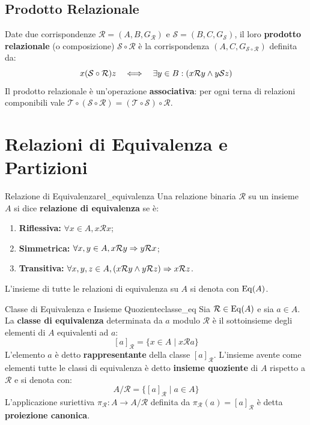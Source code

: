 \subsection{Prodotto Relazionale}
Date due corrispondenze $\mathcal{R} = (A, B, G_\mathcal{R})$ e $\mathcal{S} = (B, C, G_\mathcal{S})$, il loro \textbf{prodotto relazionale} (o composizione) $\mathcal{S} \circ \mathcal{R}$ è la corrispondenza $(A, C, G_{\mathcal{S}\circ\mathcal{R}})$ definita da:
\[
    x (\mathcal{S} \circ \mathcal{R}) z \quad \Longleftrightarrow \quad \exists y \in B : (x \mathcal{R} y \wedge y \mathcal{S} z)
\]
Il prodotto relazionale è un'operazione \textbf{associativa}: per ogni terna di relazioni componibili vale $\mathcal{T} \circ (\mathcal{S} \circ \mathcal{R}) = (\mathcal{T} \circ \mathcal{S}) \circ \mathcal{R}$.

\section{Relazioni di Equivalenza e Partizioni}

\begin{definizione}{Relazione di Equivalenza}{rel_equivalenza}
Una relazione binaria $\mathcal{R}$ su un insieme $A$ si dice \textbf{relazione di equivalenza} se è:
\begin{enumerate}
    \item \textbf{Riflessiva:} $\forall x \in A, x \mathcal{R} x$;
    \item \textbf{Simmetrica:} $\forall x, y \in A, x \mathcal{R} y \Rightarrow y \mathcal{R} x$;
    \item \textbf{Transitiva:} $\forall x, y, z \in A, (x \mathcal{R} y \wedge y \mathcal{R} z) \Rightarrow x \mathcal{R} z$.
\end{enumerate}
L'insieme di tutte le relazioni di equivalenza su $A$ si denota con $\operatorname{Eq}(A)$.
\end{definizione}

\begin{definizione}{Classe di Equivalenza e Insieme Quoziente}{classe_eq}
Sia $\mathcal{R} \in \operatorname{Eq}(A)$ e sia $a \in A$. La \textbf{classe di equivalenza} determinata da $a$ modulo $\mathcal{R}$ è il sottoinsieme degli elementi di $A$ equivalenti ad $a$:
\[
    [a]_\mathcal{R} = \{x \in A \mid x \mathcal{R} a\}
\]
L'elemento $a$ è detto \textbf{rappresentante} della classe $[a]_\mathcal{R}$.
L'insieme avente come elementi tutte le classi di equivalenza è detto \textbf{insieme quoziente} di $A$ rispetto a $\mathcal{R}$ e si denota con:
\[
    A/\mathcal{R} = \{[a]_\mathcal{R} \mid a \in A\}
\]
L'applicazione suriettiva $\pi_\mathcal{R}: A \to A/\mathcal{R}$ definita da $\pi_\mathcal{R}(a) = [a]_\mathcal{R}$ è detta \textbf{proiezione canonica}.
\end{definizione}

